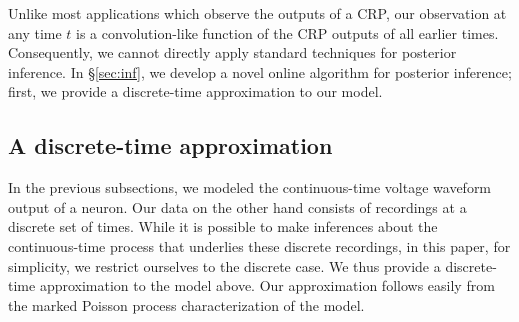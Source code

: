 Unlike most applications which observe the outputs of a CRP, our observation at any time $t$ is a convolution-like function of the CRP outputs of all
earlier times. Consequently, we cannot directly apply standard techniques for posterior inference. In \S \ref{sec:inf}, we develop a novel online 
algorithm for posterior inference; first, we provide a discrete-time approximation to our model.


\subsection{A discrete-time approximation}
In the previous subsections, we modeled the continuous-time voltage waveform output of a neuron. Our data on the other hand consists of recordings
at a discrete set of times. While it is possible to make inferences about the continuous-time process that underlies these discrete recordings,
in this paper, for simplicity, we restrict ourselves to the discrete case. We thus provide a discrete-time approximation to the model above. 
Our approximation follows easily from the marked Poisson process characterization of the model.

